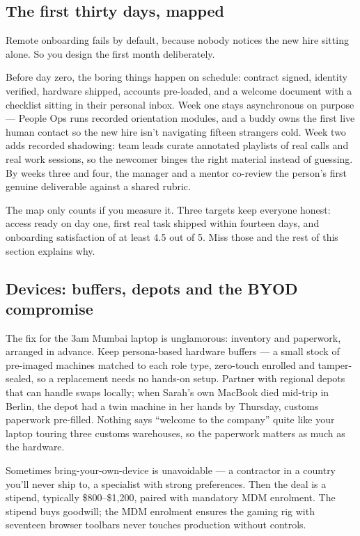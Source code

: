 \subsection{The first thirty days, mapped}


Remote onboarding fails by default, because nobody notices the new hire sitting alone. So you design the first month deliberately.


Before day zero, the boring things happen on schedule: contract signed, identity verified, hardware shipped, accounts pre-loaded, and a welcome document with a checklist sitting in their personal inbox. Week one stays asynchronous on purpose — People Ops runs recorded orientation modules, and a buddy owns the first live human contact so the new hire isn't navigating fifteen strangers cold. Week two adds recorded shadowing: team leads curate annotated playlists of real calls and real work sessions, so the newcomer binges the right material instead of guessing. By weeks three and four, the manager and a mentor co-review the person's first genuine deliverable against a shared rubric.


The map only counts if you measure it. Three targets keep everyone honest: access ready on day one, first real task shipped within fourteen days, and onboarding satisfaction of at least 4.5 out of 5. Miss those and the rest of this section explains why.



\subsection{Devices: buffers, depots and the BYOD compromise}


The fix for the 3am Mumbai laptop is unglamorous: inventory and paperwork, arranged in advance. Keep persona-based hardware buffers — a small stock of pre-imaged machines matched to each role type, zero-touch enrolled and tamper-sealed, so a replacement needs no hands-on setup. Partner with regional depots that can handle swaps locally; when Sarah's own MacBook died mid-trip in Berlin, the depot had a twin machine in her hands by Thursday, customs paperwork pre-filled. Nothing says ``welcome to the company'' quite like your laptop touring three customs warehouses, so the paperwork matters as much as the hardware.


Sometimes bring-your-own-device is unavoidable — a contractor in a country you'll never ship to, a specialist with strong preferences. Then the deal is a stipend, typically \$800–\$1,200, paired with mandatory MDM enrolment. The stipend buys goodwill; the MDM enrolment ensures the gaming rig with seventeen browser toolbars never touches production without controls.



